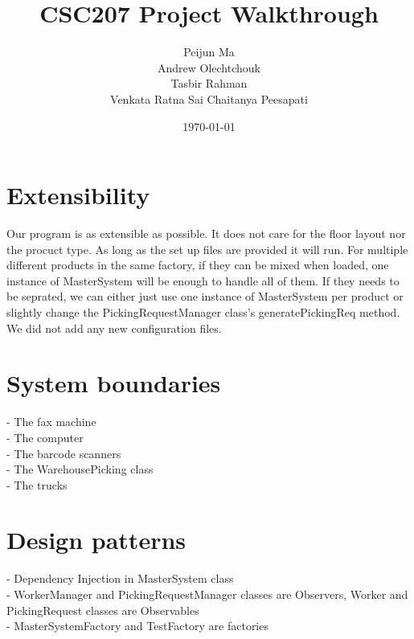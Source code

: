 \documentclass[12pt]{article}
\title{CSC207 Project Walkthrough}
\author{Peijun Ma\\Andrew Olechtchouk\\Tasbir Rahman\\Venkata Ratna Sai Chaitanya Peesapati}
\date{\today}
\begin{document}
    \maketitle
    \pagebreak

\section*{Extensibility}
    Our program is as extensible as possible. It does not care for the floor layout nor the procuct type. As long as the set up files are provided it will run. For multiple different products in the same factory, if they can be mixed when loaded, one instance of MasterSystem will be enough to handle all of them. If they needs to be seprated, we can either just use one instance of MasterSystem per product or slightly change the PickingRequestManager class's generatePickingReq method. We did not add any new configuration files.
\pagebreak
\section*{System boundaries}
    - The fax machine\\
    - The computer\\
    - The barcode scanners\\
    - The WarehousePicking class\\
    - The trucks
\pagebreak
\section*{Design patterns}
- Dependency Injection in MasterSystem class\\
- WorkerManager and PickingRequestManager classes are Observers, Worker and PickingRequest classes are Observables\\
- MasterSystemFactory and TestFactory are factories\\
\pagebreak
\end{document}
